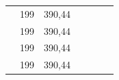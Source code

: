 \documentclass[a4paper, 12pt]{article}
\begin{document}
\begin{table}[H]
\begin{tabular}{ccccccc}
                \multicolumn{1}{|c|}{} & \multicolumn{1}{c|}{199} & \multicolumn{1}{c|}{390,44} & \multicolumn{1}{c|}{} & \multicolumn{1}{c|}{} & \multicolumn{1}{c|}{} & \multicolumn{1}{c|}{} \\ \cline{2-3}
                \multicolumn{1}{|c|}{} & \multicolumn{1}{c|}{199} & \multicolumn{1}{c|}{390,44} & \multicolumn{1}{c|}{} & \multicolumn{1}{c|}{} & \multicolumn{1}{c|}{} & \multicolumn{1}{c|}{} \\ \cline{2-3}
                \multicolumn{1}{|c|}{} & \multicolumn{1}{c|}{199} & \multicolumn{1}{c|}{390,44} & \multicolumn{1}{c|}{} & \multicolumn{1}{c|}{} & \multicolumn{1}{c|}{} & \multicolumn{1}{c|}{} \\ \cline{2-3}
                \multicolumn{1}{|c|}{} & \multicolumn{1}{c|}{199} & \multicolumn{1}{c|}{390,44} & \multicolumn{1}{c|}{} & \multicolumn{1}{c|}{} & \multicolumn{1}{c|}{} & \multicolumn{1}{c|}{} \\ \hline
            \end{tabular}
        \end{table}
        
\end{document}
